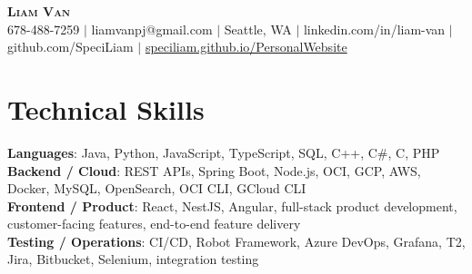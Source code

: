 \documentclass[letterpaper,11pt]{article}
\begin{document}

%
\begin{center}
    \textbf{\Huge \scshape Liam Van} \\ \vspace{1pt}
    \small 678-488-7259 $|$ \small {liamvanpj@gmail.com} $|$ Seattle, WA
 {{$|$ linkedin.com/in/liam-van} {$|$ github.com/SpeciLiam} {$|$ \href{https://speciliam.github.io/PersonalWebsite}{speciliam.github.io/PersonalWebsite}}}

\end{center}

\section{Technical Skills}
 \begin{itemize}[leftmargin=0.15in, label={}]
    \small{\item{
     \textbf{Languages}{: Java, Python, JavaScript, TypeScript, SQL, C++, C\#, C, PHP} \\
     \textbf{Backend / Cloud}{: REST APIs, Spring Boot, Node.js, OCI, GCP, AWS, Docker, MySQL, OpenSearch, OCI CLI, GCloud CLI} \\
     \textbf{Frontend / Product}{: React, NestJS, Angular, full-stack product development, customer-facing features, end-to-end feature delivery} \\
     \textbf{Testing / Operations}{: CI/CD, Robot Framework, Azure DevOps, Grafana, T2, Jira, Bitbucket, Selenium, integration testing} \\
    }}
 \end{itemize}
%
\end{document}
